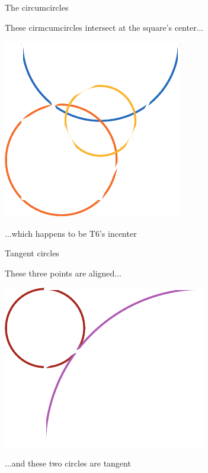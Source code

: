 \documentclass[14pt]{beamer}
\begin{document}

    \begin{frame}{The circumcircles}
        \begin{center}
            These cirmcumcircles intersect at the square's center...
        \end{center}
        \vspace{0.90em}
        \hspace{5.25em} \includegraphics[scale=1.0]{figures/figure019g.pdf} \\
        \begin{center}
            ...which happens to be T6's incenter
        \end{center}
    \end{frame}


    \begin{frame}{Tangent circles}
        \begin{center}
            These three points are aligned...
        \end{center}
        \hspace{3.92em} \includegraphics[scale=1.0]{figures/figure019d.pdf} \\
        \begin{center}
             ...and these two circles are tangent
        \end{center}
    \end{frame}
\end{document}
